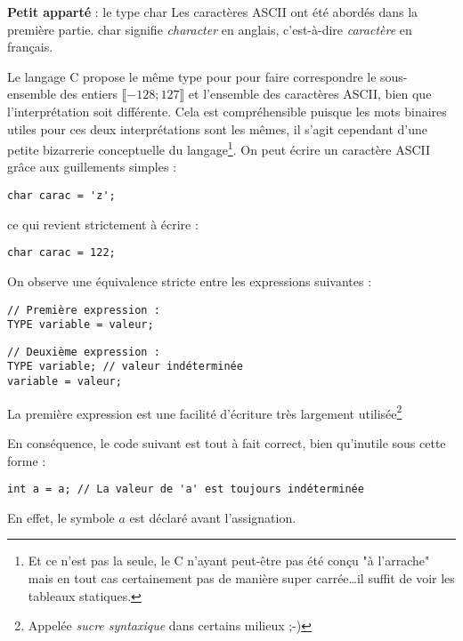 \documentclass[../../../main.tex]{subfiles}
\begin{document}
\begin{minitelbasicbox}{\textbf{Petit apparté} : le type \textsf{char}}
Les caractères ASCII ont été abordés dans la première partie. \textsf{char} signifie \textit{character} en anglais, c'est-à-dire \textit{caractère} en français.

Le langage C propose le même type pour pour faire correspondre le sous-ensemble des entiers $\llbracket-128; 127\rrbracket$ et l'ensemble des caractères ASCII, bien que l'interprétation soit différente. Cela est compréhensible puisque les mots binaires utiles pour ces deux interprétations sont les mêmes, il s'agit cependant d'une petite bizarrerie conceptuelle du langage\footnote{Et ce n'est pas la seule, le C n'ayant peut-être pas été conçu "à l'arrache" mais en tout cas certainement pas de manière super carrée\dots il suffit de voir les tableaux statiques.}. On peut écrire un caractère ASCII grâce aux guillements simples :
\begin{verbatim}
char carac = 'z';
\end{verbatim}
ce qui revient strictement à écrire :
\begin{verbatim}
char carac = 122;
\end{verbatim}
\end{minitelbasicbox}

On observe une équivalence stricte entre les expressions suivantes : 

\begin{minipage}{0.5\textwidth}
\begin{verbatim}
// Première expression :
TYPE variable = valeur;

\end{verbatim}
\end{minipage}
\begin{minipage}{0.5\textwidth}
\begin{verbatim}
// Deuxième expression :
TYPE variable; // valeur indéterminée
variable = valeur;
\end{verbatim}
\end{minipage}

La première expression est une facilité d'écriture très largement utilisée\footnote{Appelée \textit{sucre syntaxique} dans certains milieux ;-)}
 
En conséquence, le code suivant est tout à fait correct, bien qu'inutile sous cette forme :
\begin{verbatim}
int a = a; // La valeur de 'a' est toujours indéterminée
\end{verbatim}
En effet, le symbole $a$ est déclaré avant l'assignation.
\end{document}
